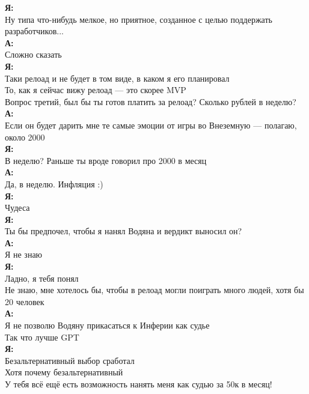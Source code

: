 \textbf{Я:}\\
Ну типа что-нибудь мелкое, но приятное, созданное с целью поддержать разработчиков...\\

\textbf{А:}\\
Сложно сказать\\

\textbf{Я:}\\
Таки релоад и не будет в том виде, в каком я его планировал\\
То, как я сейчас вижу релоад — это скорее MVP\\
Вопрос третий, был бы ты готов платить за релоад? Сколько рублей в неделю?\\

\textbf{А:}\\
Если он будет дарить мне те самые эмоции от игры во Внеземную — полагаю, около 2000\\

\textbf{Я:}\\
В неделю? Раньше ты вроде говорил про 2000 в месяц\\

\textbf{А:}\\
Да, в неделю. Инфляция :)\\

\textbf{Я:}\\
Чудеса\\

\textbf{Я:}\\
Ты бы предпочел, чтобы я нанял Водяна и вердикт выносил он?\\

\textbf{А:}\\
Я не знаю\\

\textbf{Я:}\\
Ладно, я тебя понял\\
Не знаю, мне хотелось бы, чтобы в релоад могли поиграть много людей, хотя бы 20 человек\\

\textbf{А:}\\
Я не позволю Водяну прикасаться к Инферии как судье\\
Так что лучше GPT\\

\textbf{Я:}\\
Безальтернативный выбор сработал\\
Хотя почему безальтернативный\\
У тебя всё ещё есть возможность нанять меня как судью за 50к в месяц!\\

